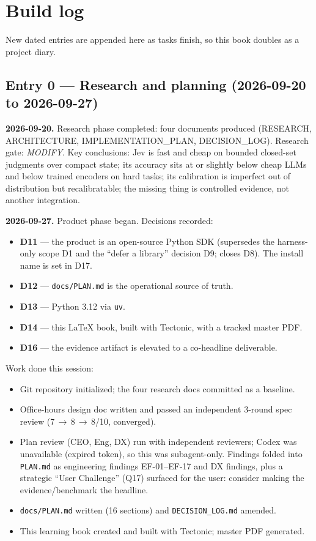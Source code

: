 \chapter{Build log}
\label{ch:buildlog}

New dated entries are appended here as tasks finish, so this book doubles as a project diary.

\section*{Entry 0 --- Research and planning (2026-09-20 to 2026-09-27)}

\textbf{2026-09-20.} Research phase completed: four documents produced (RESEARCH,
ARCHITECTURE, IMPLEMENTATION\_PLAN, DECISION\_LOG). Research gate: \emph{MODIFY}. Key
conclusions: Jev is fast and cheap on bounded closed-set judgments over compact state; its
accuracy sits at or slightly below cheap LLMs and below trained encoders on hard tasks; its
calibration is imperfect out of distribution but recalibratable; the missing thing is
controlled evidence, not another integration.

\textbf{2026-09-27.} Product phase began. Decisions recorded:
\begin{itemize}[itemsep=1pt]
  \item \textbf{D11} --- the product is an open-source Python SDK (supersedes the
    harness-only scope D1 and the ``defer a library'' decision D9; closes D8).
    The install name is set in D17.
  \item \textbf{D12} --- \texttt{docs/PLAN.md} is the operational source of truth.
  \item \textbf{D13} --- Python 3.12 via \texttt{uv}.
  \item \textbf{D14} --- this LaTeX book, built with Tectonic, with a tracked master PDF.
  \item \textbf{D16} --- the evidence artifact is elevated to a co-headline deliverable.
\end{itemize}

Work done this session:
\begin{itemize}[itemsep=1pt]
  \item Git repository initialized; the four research docs committed as a baseline.
  \item Office-hours design doc written and passed an independent 3-round spec review
    (7\,$\to$\,8\,$\to$\,8/10, converged).
  \item Plan review (CEO, Eng, DX) run with independent reviewers; Codex was unavailable
    (expired token), so this was subagent-only. Findings folded into \texttt{PLAN.md} as
    engineering findings EF-01--EF-17 and DX findings, plus a strategic ``User Challenge''
    (Q17) surfaced for the user: consider making the evidence/benchmark the headline.
  \item \texttt{docs/PLAN.md} written (16 sections) and \texttt{DECISION\_LOG.md} amended.
  \item This learning book created and built with Tectonic; master PDF generated.
\end{itemize}

